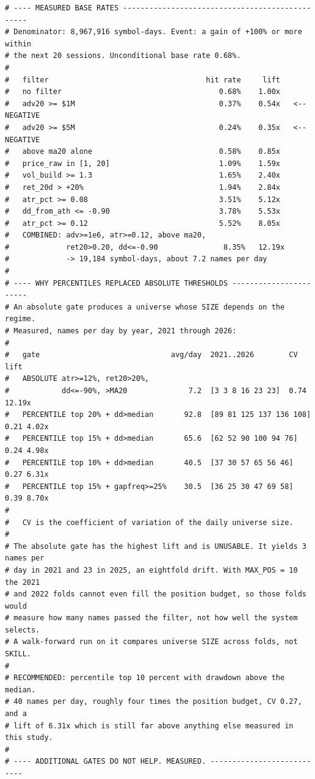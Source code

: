 \documentclass[10pt]{article}
\begin{document}
\begin{lstlisting}
# ---- MEASURED BASE RATES ------------------------------------------------
# Denominator: 8,967,916 symbol-days. Event: a gain of +100% or more within
# the next 20 sessions. Unconditional base rate 0.68%.
#
#   filter                                    hit rate     lift
#   no filter                                    0.68%    1.00x
#   adv20 >= $1M                                 0.37%    0.54x   <-- NEGATIVE
#   adv20 >= $5M                                 0.24%    0.35x   <-- NEGATIVE
#   above ma20 alone                             0.58%    0.85x
#   price_raw in [1, 20]                         1.09%    1.59x
#   vol_build >= 1.3                             1.65%    2.40x
#   ret_20d > +20%                               1.94%    2.84x
#   atr_pct >= 0.08                              3.51%    5.12x
#   dd_from_ath <= -0.90                         3.78%    5.53x
#   atr_pct >= 0.12                              5.52%    8.05x
#   COMBINED: adv>=1e6, atr>=0.12, above ma20,
#             ret20>0.20, dd<=-0.90               8.35%   12.19x
#             -> 19,184 symbol-days, about 7.2 names per day
#
# ---- WHY PERCENTILES REPLACED ABSOLUTE THRESHOLDS -----------------------
# An absolute gate produces a universe whose SIZE depends on the regime.
# Measured, names per day by year, 2021 through 2026:
#
#   gate                              avg/day  2021..2026        CV    lift
#   ABSOLUTE atr>=12%, ret20>20%,
#            dd<=-90%, >MA20              7.2  [3 3 8 16 23 23]  0.74  12.19x
#   PERCENTILE top 20% + dd>median       92.8  [89 81 125 137 136 108] 0.21 4.02x
#   PERCENTILE top 15% + dd>median       65.6  [62 52 90 100 94 76]    0.24 4.98x
#   PERCENTILE top 10% + dd>median       40.5  [37 30 57 65 56 46]     0.27 6.31x
#   PERCENTILE top 15% + gapfreq>=25%    30.5  [36 25 30 47 69 58]     0.39 8.70x
#
#   CV is the coefficient of variation of the daily universe size.
#
# The absolute gate has the highest lift and is UNUSABLE. It yields 3 names per
# day in 2021 and 23 in 2025, an eightfold drift. With MAX_POS = 10 the 2021
# and 2022 folds cannot even fill the position budget, so those folds would
# measure how many names passed the filter, not how well the system selects.
# A walk-forward run on it compares universe SIZE across folds, not SKILL.
#
# RECOMMENDED: percentile top 10 percent with drawdown above the median.
# 40 names per day, roughly four times the position budget, CV 0.27, and a
# lift of 6.31x which is still far above anything else measured in this study.
#
# ---- ADDITIONAL GATES DO NOT HELP. MEASURED. ---------------------------

\end{lstlisting}
\end{document}
